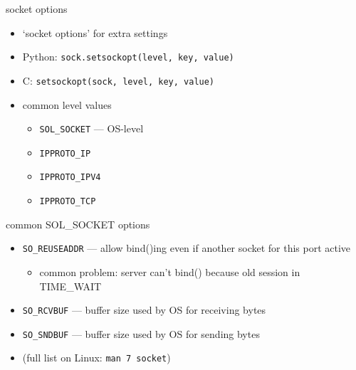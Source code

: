 \begin{frame}[fragile]{socket options}
\begin{itemize}
\item `socket options' for extra settings
\item Python: \texttt{sock.setsockopt(level, key, value)}
\item C: \texttt{setsockopt(sock, level, key, value)}
\vspace{.5cm}
\item common level values
    \begin{itemize}
    \item \texttt{SOL\_SOCKET} --- OS-level
    \item \texttt{IPPROTO\_IP}
    \item \texttt{IPPROTO\_IPV4}
    \item \texttt{IPPROTO\_TCP}
    \end{itemize}
\end{itemize}
\end{frame}

\begin{frame}{common SOL\_SOCKET options}
    \begin{itemize}
    \item \texttt{SO\_REUSEADDR} --- allow bind()ing even if another socket for this port active
        \begin{itemize}
        \item common problem: server can't bind() because old session in TIME\_WAIT
        \end{itemize}
    \item \texttt{SO\_RCVBUF} --- buffer size used by OS for receiving bytes
    \item \texttt{SO\_SNDBUF} --- buffer size used by OS for sending bytes
    \vspace{.5cm}
    \item (full list on Linux: \texttt{man 7 socket})
    \end{itemize}
\end{frame}

